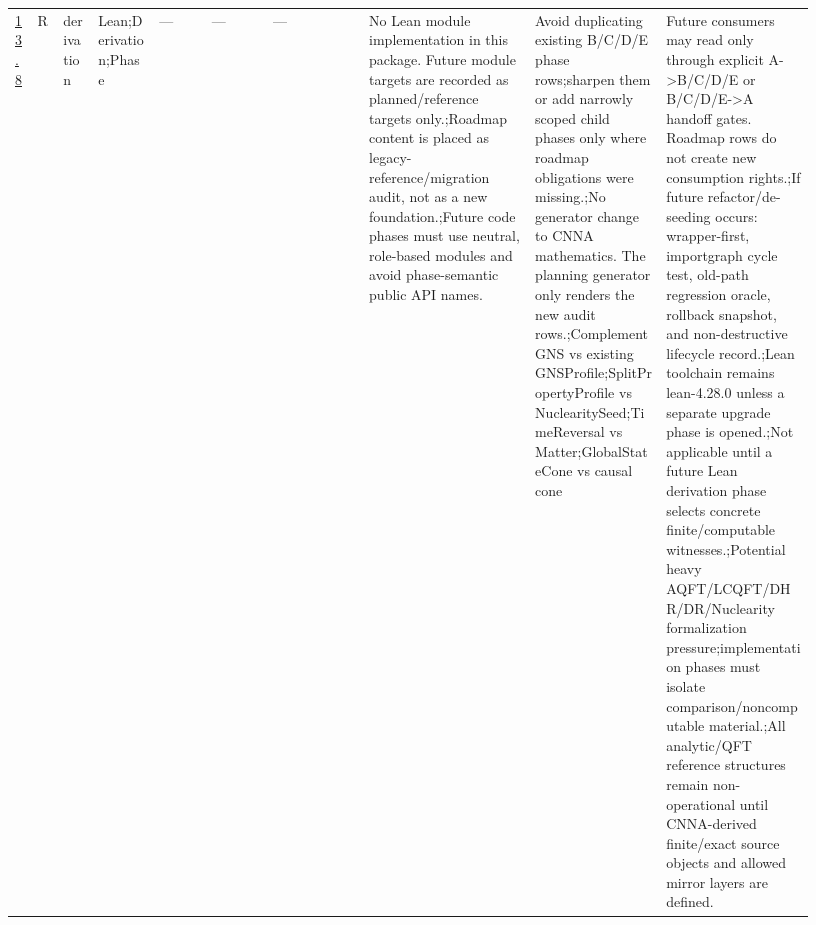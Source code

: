 \begin{longtable}{L{0.026\linewidth} L{0.024\linewidth} L{0.045\linewidth} L{0.07\linewidth} L{0.065\linewidth} L{0.075\linewidth} L{0.11\linewidth} L{0.19\linewidth} L{0.155\linewidth} L{0.17\linewidth}}
\hyperlink{phase-row-13-8}{13.8} & R & derivation & Lean;\newline Derivation;\newline Phase & --- & --- & --- & No Lean module implementation in this package. Future module targets are recorded as planned/\allowbreak{}reference targets only.;\newline Roadmap content is placed as legacy-reference/\allowbreak{}migration audit, not as a new foundation.;\newline Future code phases must use neutral, role-based modules and avoid phase-semantic public API names. & Avoid duplicating existing B/\allowbreak{}C/\allowbreak{}D/\allowbreak{}E phase rows;\newline sharpen them or add narrowly scoped child phases only where roadmap obligations were missing.;\newline No generator change to CNNA mathematics. The planning generator only renders the new audit rows.;\newline ComplementGNS vs existing GNSProfile;\newline SplitPropertyProfile vs NuclearitySeed;\newline TimeReversal vs Matter;\newline GlobalStateCone vs causal cone & Future consumers may read only through explicit A->B/\allowbreak{}C/\allowbreak{}D/\allowbreak{}E or B/\allowbreak{}C/\allowbreak{}D/\allowbreak{}E->A handoff gates. Roadmap rows do not create new consumption rights.;\newline If future refactor/\allowbreak{}de-seeding occurs: wrapper-first, importgraph cycle test, old-path regression oracle, rollback snapshot, and non-destructive lifecycle record.;\newline Lean toolchain remains lean-4.28.0 unless a separate upgrade phase is opened.;\newline Not applicable until a future Lean derivation phase selects concrete finite/\allowbreak{}computable witnesses.;\newline Potential heavy AQFT/\allowbreak{}LCQFT/\allowbreak{}DHR/\allowbreak{}DR/\allowbreak{}Nuclearity formalization pressure;\newline implementation phases must isolate comparison/\allowbreak{}noncomputable material.;\newline All analytic/\allowbreak{}QFT reference structures remain non-operational until CNNA-derived finite/\allowbreak{}exact source objects and allowed mirror layers are defined.\\

\end{longtable}
